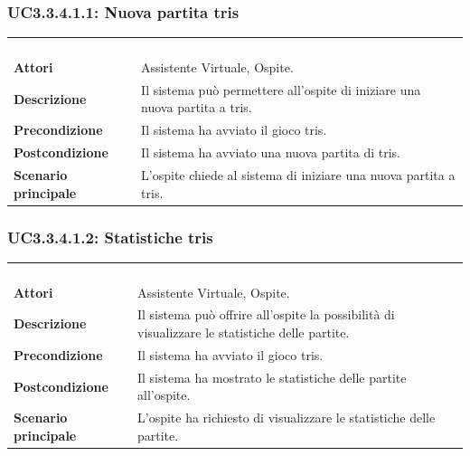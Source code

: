 \subsubsection{UC3.3.4.1.1: Nuova partita tris}
\label{UC3.3.4.1.1}
\begin{longtable}{l|p{10cm}}
	\rowcolor[gray]{0.8} \multicolumn{2}{c}{} \\
	\rowcolor[gray]{0.8} \multicolumn{2}{c}{\textbf{UC3.3.4.1.1 - Nuova partita tris}} \\
	\rowcolor[gray]{0.8} \multicolumn{2}{c}{} \\
	\hline
	&\\
	\textbf{Attori} & Assistente Virtuale, Ospite.\\[7pt]
	\textbf{Descrizione} & Il sistema può permettere all'ospite di iniziare una nuova partita a tris.\\[7pt]
	\textbf{Precondizione} & Il sistema ha avviato il gioco tris.
	\\[7pt]
	\textbf{Postcondizione} & Il sistema ha avviato una nuova partita di tris.
	\\[7pt]
	\textbf{Scenario principale} &L'ospite chiede al sistema di iniziare una nuova partita a tris.\\[7pt]\hline
\end{longtable}

\subsubsection{UC3.3.4.1.2: Statistiche tris}
\label{UC3.3.4.1.2}
\begin{longtable}{l|p{10cm}}
	\rowcolor[gray]{0.8} \multicolumn{2}{c}{} \\
	\rowcolor[gray]{0.8} \multicolumn{2}{c}{\textbf{UC3.3.4.1.2 - Statistiche tris}} \\
	\rowcolor[gray]{0.8} \multicolumn{2}{c}{} \\
	\hline
	&\\
	\textbf{Attori} & Assistente Virtuale, Ospite.\\[7pt]
	\textbf{Descrizione} & Il sistema può offrire all'ospite la possibilità di visualizzare le statistiche delle partite.\\[7pt]
	\textbf{Precondizione} & Il sistema ha avviato il gioco tris.\\[7pt]
	\textbf{Postcondizione} & Il sistema ha mostrato le statistiche delle partite all'ospite.\\[7pt]
	\textbf{Scenario principale} &L'ospite ha richiesto di visualizzare le statistiche delle partite.\\[7pt]\hline
\end{longtable}

